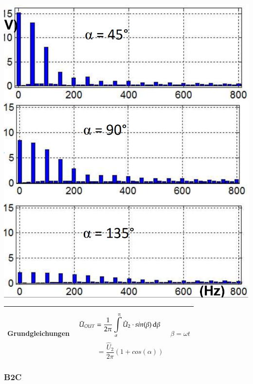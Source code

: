 \begin{minipage}{0.25\linewidth}
    \includegraphics[width=\linewidth]{images/M1COW} 
\end{minipage}
\newline

\begin{longtable}{| p{} | p{} | p{} |} %
    \hline
    \textbf{Grundgleichungen}&
    \[ \bar{U}_{OUT} = \dfrac{1}{2\pi} \int\limits_{\alpha}^{\pi}\hat{U}_2\cdot sin(\beta) \mathop{}\!\mathrm{d} \beta\]
    \[ \qquad \quad  =\dfrac{\hat{U}_2}{2\pi}(1+cos(\alpha)) \]&$ \beta = \omega t $\\
    \hline   
\end{longtable}



\subsubsection{B2C}

